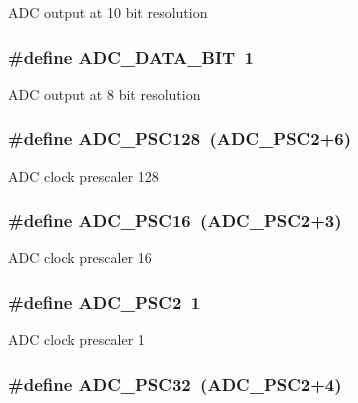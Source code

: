 A\-D\-C output at 10 bit resolution \hypertarget{group__ex4__adc_gae57d5a32e1a79311452cc1cdcb570614}{
\subsubsection[{A\-D\-C\-\_\-\-D\-A\-T\-A\-\_\-8\-B\-I\-T}]{\setlength{\rightskip}{0pt plus 5cm}\#define A\-D\-C\-\_\-\-D\-A\-T\-A\-\_\-B\-I\-T~1}}\label{group__ex4__adc_gae57d5a32e1a79311452cc1cdcb570614}
A\-D\-C output at 8 bit resolution \hypertarget{group__ex4__adc_ga0d1ee1a83dd4cc2104ddb943a06b881b}{
\subsubsection[{A\-D\-C\-\_\-\-P\-S\-C128}]{\setlength{\rightskip}{0pt plus 5cm}\#define A\-D\-C\-\_\-\-P\-S\-C128~({\bf A\-D\-C\-\_\-\-P\-S\-C2}+6)}}\label{group__ex4__adc_ga0d1ee1a83dd4cc2104ddb943a06b881b}
A\-D\-C clock prescaler 128 \hypertarget{group__ex4__adc_ga4d372cc3fd8e1590ba3c73d22d54115c}{
\subsubsection[{A\-D\-C\-\_\-\-P\-S\-C16}]{\setlength{\rightskip}{0pt plus 5cm}\#define A\-D\-C\-\_\-\-P\-S\-C16~({\bf A\-D\-C\-\_\-\-P\-S\-C2}+3)}}\label{group__ex4__adc_ga4d372cc3fd8e1590ba3c73d22d54115c}
A\-D\-C clock prescaler 16 \hypertarget{group__ex4__adc_ga17dcbe58ddaee17c0a9240f875c5fafa}{
\subsubsection[{A\-D\-C\-\_\-\-P\-S\-C2}]{\setlength{\rightskip}{0pt plus 5cm}\#define A\-D\-C\-\_\-\-P\-S\-C2~1}}\label{group__ex4__adc_ga17dcbe58ddaee17c0a9240f875c5fafa}
A\-D\-C clock prescaler 1 \hypertarget{group__ex4__adc_ga0e7e1b2aaf0da2d28cabe6ed160da553}{
\subsubsection[{A\-D\-C\-\_\-\-P\-S\-C32}]{\setlength{\rightskip}{0pt plus 5cm}\#define A\-D\-C\-\_\-\-P\-S\-C32~({\bf A\-D\-C\-\_\-\-P\-S\-C2}+4)}}\label{group__ex4__adc_ga0e7e1b2aaf0da2d28cabe6ed160da553}

